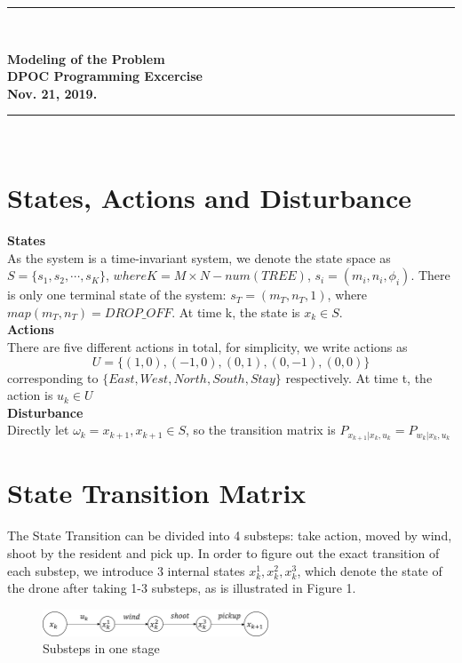 \documentclass[fleqn,12pt, a4paper]{article}
\theoremstyle{definition}
\numberwithin{equation}{section}
\begin{document}
\thispagestyle{plain}

\vspace*{-1.5cm}
{\noindent \rule{15.8cm}{.3mm} \\[.3cm]}
\begin{center} \bf
{\large Modeling of the Problem }\medskip
\\
DPOC Programming Excercise \medskip
\\ Nov. 21, 2019. 
\end{center}
\rule{15.8cm}{.3mm} \\[1cm]
\section{States, Actions and Disturbance}
\textbf{States}\\
As the system is a time-invariant system, we denote the state space as $S = \{s_1, s_2, \cdots, s_K\}$, $where K = M\times N-num(TREE)$, $s_i = (m_i, n_i, \phi_i)$. There is only one terminal state of the system: $s_T = (m_T, n_T, 1)$, where $map(m_T, n_T) = DROP\_OFF$. At time k, the state is $x_k \in S$.\\

\textbf{Actions}\\
There are five different actions in total, for simplicity, we write actions as $$U=\{(1,0),(-1,0),(0,1),(0,-1),(0,0)\}$$ corresponding to $\{East, West, North, South, Stay\}$ respectively. At time t, the action is $u_k \in U$\\

\textbf{Disturbance}\\
Directly let $\omega_k = x_{k+1}, x_{k+1}\in S$, so the transition matrix is $P_{x_{k+1}|x_k, u_k} = P_{w_k|x_k,u_k}$
\section{State Transition Matrix}
The State Transition can be divided into 4 substeps: take action, moved by wind, shoot by the resident and pick up. In order to figure out the exact transition of each substep, we introduce 3 internal states $x_k^1, x_k^2, x_k^3$, which denote the state of the drone after taking 1-3 substeps, as is illustrated in Figure 1.\\

\begin{figure}[htp]
\centering  
\includegraphics[width=0.6\textwidth]{substates.png}
\caption{Substeps in one stage}
\label{substep}
\end{figure}
\end{document}
